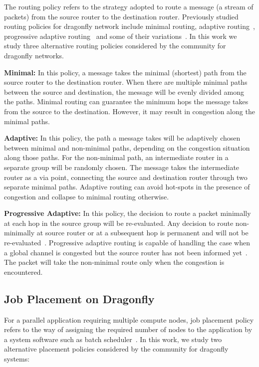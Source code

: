 The routing policy refers to the strategy adopted to route a message (a stream of packets) from the source router to the destination router. Previously studied routing policies for dragonfly network include minimal routing, adaptive routing~\cite{dally-dragonfly}, progressive adaptive routing~\cite{jiang} and some of their variations~\cite{won-prog-adaptive}. In this work we study three alternative routing policies considered by the community for dragonfly networks.

\textbf{Minimal:} In this policy, a message takes the minimal (shortest) path from the source router to the destination router. When there are multiple minimal paths between the source and destination, the message will be evenly divided among the paths. Minimal routing can guarantee the minimum hops the message takes from the source to the destination. However, it may result in congestion along the minimal paths. 

\textbf{Adaptive:} In this policy, the path a message takes will be adaptively chosen between minimal and non-minimal paths, depending on the congestion situation along those paths. For the non-minimal path, an intermediate router in a separate group will be randomly chosen. The message takes the intermediate router as a via point, connecting the source and destination router through two separate minimal paths. Adaptive routing can avoid hot-spots in the presence of congestion and collapse to minimal routing otherwise. 

\textbf{Progressive Adaptive:} In this policy, the decision to route a packet minimally at each hop in the source group will be re-evaluated.
Any decision to route non-minimally at source router or at a subsequent hop is permanent and will not be re-evaluated~\cite{jiang}. 
Progressive adaptive routing is capable of handling the case when a global channel is congested but the source router has not been informed yet~\cite{jiang}. The packet will take the non-minimal route only when the congestion is encountered. 

\subsection{Job Placement on Dragonfly}
\label{sec:placement-schemes}

For a parallel application requiring multiple compute nodes, job placement policy refers to the way of assigning the required number of nodes to the application by a system software such as batch scheduler~\cite{xu-cluster14}. In this work, we study two alternative placement policies considered by the community for dragonfly systems: 


